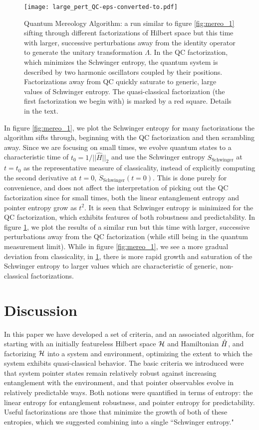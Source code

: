 \documentclass[aps,pra,onecolumn,nofootinbib,12pt,tightenlines]{revtex4-1}
\begin{document}
 \begin{figure}
\texttt{[image: large\_pert\_QC-eps-converted-to.pdf]}
\caption{Quantum Mereology Algorithm: a run similar to figure \ref{fig:mereo_1} sifting through different factorizations of Hilbert space but this time with larger, successive perturbations away from the identity operator to generate the unitary transformation $\Lambda$. In the QC factorization, which minimizes the Schwinger entropy, the quantum system is described by two harmonic oscillators coupled by their positions. Factorizations away from QC quickly saturate to generic, large values of Schwinger entropy. The quasi-classical factorization (the first factorization we begin with) is marked by a red square. Details in the text.}
\label{fig:mereo_2}
\end{figure}

 In figure \ref{fig:mereo_1}, we plot the Schwinger entropy for many factorizations the algorithm sifts through, beginning with the QC factorization and then scrambling away. Since we are focusing on small times, we evolve quantum states to a characteristic time of $t_{0} = 1/||\hat{H}||_{2}$ and use the Schwinger entropy $S_{\mathrm{Schwinger}}$ at $t = t_{0}$ as the representative measure of classicality, instead of explicitly computing the second derivative at $t=0$, $\ddot{S}_{\mathrm{Schwinger}}(t=0)$. This is done purely for convenience, and does not affect the interpretation of picking out the QC factorization since for small times, both the linear entanglement entropy and pointer entropy grow as $t^2$. It is seen that Schwinger entropy is minimized for the QC factorization, which exhibits features of both robustness and predictability. In figure \ref{fig:mereo_2}, we plot the results of a similar run but this time with larger, successive perturbations away from the QC factorization (while still being in the quantum measurement limit). While in figure \ref{fig:mereo_1}, we see a more gradual deviation from classicality, in \ref{fig:mereo_2}, there is more rapid growth and saturation of the Schwinger entropy to larger values which are characteristic of generic, non-classical factorizations.

\section{Discussion}

In this paper we have developed a set of criteria, and an associated algorithm, for starting with an initially featureless Hilbert space $\mathcal{H}$ and Hamiltonian $\hat{H}$, and factorizing $\mathcal{H}$ into a system and environment, optimizing the extent to which the system exhibits quasi-classical behavior. 
The basic criteria we introduced were that system pointer states remain relatively robust against increasing entanglement with the environment, and that pointer observables evolve in relatively predictable ways.
Both notions were quantified in terms of entropy: the linear entropy for entanglement robustness, and pointer entropy for predictability.
Useful factorizations are those that minimize the growth of both of these entropies, which we suggested combining into a single ``Schwinger entropy."
\end{document}
